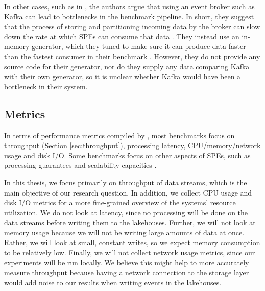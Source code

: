 In other cases, such as in \cite{karimovBenchmarkingDistributedStream2018}, the authors argue that using an event broker such as Kafka can lead to bottlenecks in the benchmark pipeline. In short, they suggest that the process of storing and partitioning incoming data by the broker can slow down the rate at which SPEs can consume that data \cite{karimovBenchmarkingDistributedStream2018}. They instead use an in-memory generator, which they tuned to make sure it can produce data faster than the fastest consumer in their benchmark \cite{karimovBenchmarkingDistributedStream2018}. However, they do not provide any source code for their generator, nor do they supply any data comparing Kafka with their own generator, so it is unclear whether Kafka would have been a bottleneck in their system.

\subsection{Metrics}
In terms of performance metrics compiled by \citeauthor{yueSurveyStreamProcessing2025} \cite{yueSurveyStreamProcessing2025}, most benchmarks focus on throughput (Section \ref{sec:throughput}), processing latency, CPU/memory/network usage and disk I/O. Some benchmarks focus on other aspects of SPEs, such as processing guarantees \cite{tahirHowReliableAre2024} and scalability capacities \cite{henningTheodoliteScalabilityBenchmarking2021}.

In this thesis, we focus primarily on throughput of data streams, which is the main objective of our research question. In addition, we collect CPU usage and disk I/O metrics for a more fine-grained overview of the systems' resource utilization. We do not look at latency, since no processing will be done on the data streams before writing them to the lakehouses. Further, we will not look at memory usage because we will not be writing large amounts of data at once. Rather, we will look at small, constant writes, so we expect memory consumption to be relatively low. Finally, we will not collect network usage metrics, since our experiments will be run locally. We believe this might help to more accurately measure throughput because having a network connection to the storage layer would add noise to our results when writing events in the lakehouses.

